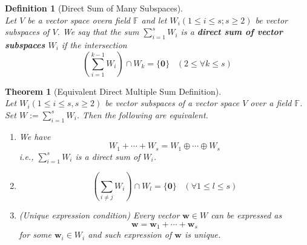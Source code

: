 \documentclass[12pt]{article}
\newtheorem{definition}{Definition}[section]
\newtheorem{theorem}{Theorem}[section]
\theoremstyle{definition}
\begin{document}
\begin{definition}[Direct Sum of Many Subspaces]
\hfill\\\normalfont Let $V$ be a vector space overa field $\mathbb{F}$ and let $W_i(1\leq i\leq s; s\geq 2)$ be vector subspaces of $V$. We say that the sum $\sum_{i=1}^s W_i$ is a \textbf{direct sum of vector subspaces} $W_i$ if the intersection
\[
\left(\sum_{i=1}^{k-1}W_i\right)\cap W_k =\{\mathbf{0}\}\;\;\;(2\leq \forall k\leq s)
\] 
\end{definition}
\begin{theorem}[Equivalent Direct Multiple Sum Definition]
\hfill\\
\normalfont Let $W_i(1\leq i\leq s, s\geq 2)$ be vector subspaces of a vector space $V$ over a field $\mathbb{F}$. Set $W:=\sum_{i=1}^sW_i$. Then the following are equivalent.
\begin{enumerate}
\item We have
\[
W_1+\cdots+W_s=W_1\oplus\cdots\oplus W_s
\]
i.e., $\sum_{i=1}^sW_i$ is a direct sum of $W_i$.
\item \[
\left(\sum_{i\neq j}W_i\right)\cap W_l=\{\mathbf{0}\}\;\;\;(\forall 1\leq l\leq s)
\]
\item (Unique expression condition) Every vector $\mathbf{w}\in W$ can be expressed as
\[
\mathbf{w}=\mathbf{w}_1+\cdots+\mathbf{w}_s
\]
for some $\mathbf{w}_i\in W_i$ and such expression of $\mathbf{w}$ is unique.
\end{enumerate}
\end{theorem}
\clearpage
\end{document}
